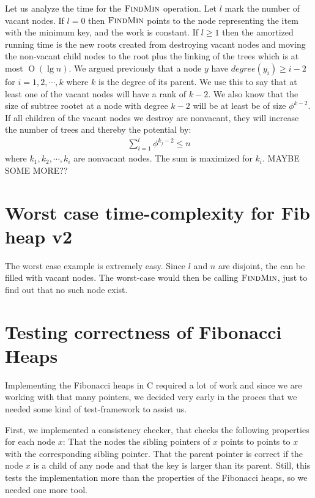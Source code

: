 \documentclass[oneside,11pt,openright]{report}
\newcommand{\BigO}[1]{\ensuremath{\operatorname{O}\left(#1\right)}}
\newcommand{\FindMin}{\textsc{FindMin}}
\begin{document}
Let us analyze the time for the $\FindMin$ operation. Let $l$ mark the number of vacant nodes. If $l=0$ then $\FindMin$ points to the node representing the item with the minimum key, and the work is constant. If $l \ge 1$ then the amortized running time is the new roots created from destroying vacant nodes and moving the non-vacant child nodes to the root plus the linking of the trees which is at most $\BigO{\lg n}$. We argued previously that a node $y$ have $degree(y_i) \ge i - 2$ for $i = 1,2,\cdots,k$ where $k$ is the degree of its parent. We use this to say that at least one of the vacant nodes will have a rank of $k-2$. We also know that the size of subtree rootet at a node with degree $k-2$ will be at least be of size $\phi^{k-2}$. If all children of the vacant nodes we destroy are nonvacant, they will increase the number of trees and thereby the potential by:
\begin{align*}
\sum_{i=1}^l \phi^{k_j-2} \le n
 \end{align*}
where $k_1, k_2,\cdots,k_i$ are nonvacant nodes. The sum is maximized for $k_i$. MAYBE SOME MORE??

\section{Worst case time-complexity for Fib heap v2}

The worst case example is extremely easy. Since $l$ and $n$ are disjoint, the can be filled with vacant nodes. The worst-case would then be calling $\FindMin$, just to find out that no such node exist. 

\section{Testing correctness of Fibonacci Heaps}

Implementing the Fibonacci heaps in C required a lot of work and since we are working with that many pointers, we decided very early in the proces that we needed some kind of test-framework to assist us. 

First, we implemented a consistency checker, that checks the following properties for each node $x$: That the nodes the sibling pointers of $x$ points to points to $x$ with the corresponding sibling pointer. That the parent pointer is correct if the node $x$ is a child of any node and that the key is larger than its parent. Still, this tests the implementation more than the properties of the Fibonacci heaps, so we needed one more tool.
\end{document}
